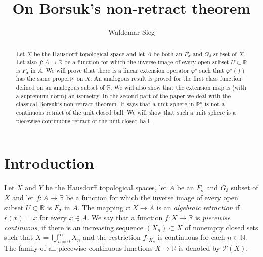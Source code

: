 \documentclass{amsart}
\title{On Borsuk's non-retract theorem}
\author{Waldemar Sieg}
\theoremstyle{definition}
\newcommand\mR{{\mathbb R}}
\newcommand\mN{{\mathbb N}}
\newcommand\restr{\mathord{\restriction}}
\newcommand\PC{{\mathscr{P}}}
\newcommand\cn{\colon}
\newcommand\fs{F_\sigma}
\newcommand\gd{G_\delta}
\newcommand\fii{{\varphi}}
\begin{document}
\maketitle

\begin{abstract}
Let $X$ be the Hausdorff topological space and let $A$ be both an $\fs$ and $\gd$ subset of $X$. Let also $f\cn A\to\mR$ be a function
for which the inverse image of every open subset $U\subset\mR$ is $\fs$ in $A$. We will prove that there is a linear extension operator 
$\fii^\star$ such that $\fii^\star(f)$ has the same property on $X$. An analogous result is proved for the first class function defined on an 
analogous subset of $\mR$. We will also show that the extension map is (with a supremum norm) an isometry. 
In the second part of the paper we deal with the classical Borsuk's non-retract theorem. It says that a unit sphere in $\mR^n$ is not 
a continuous retract of the unit closed ball. We will show that such a unit sphere is a piecewise continuous retract of the unit closed ball.
\end{abstract}



\section{Introduction}

Let $X$ and $Y$ be the Hausdorff topological spaces, let $A$ be an $\fs$ and $\gd$ subset of $X$ and let $f\cn A\to\mR$ be a function
for which the inverse image of every open subset $U\subset\mR$ is $\fs$ in $A$.
The mapping $r\cn X\to A$ is an {\em algebraic retraction} if $r(x)=x$ for every $x\in A$. We say that a function $f\cn X\to\mR$ is
{\em piecewise continuous}, if there is an increasing sequence $\left(X_n\right)\subset X$ of nonempty closed sets such
that $X=\bigcup^\infty_{n=0}X_n$ and the restriction $f_{\restr X_n}$ is continuous for each $n\in\mN$.
The family of all piecewise continuous functions $X\to\mR$ is denoted by $\PC(X)$. 
\end{document}
